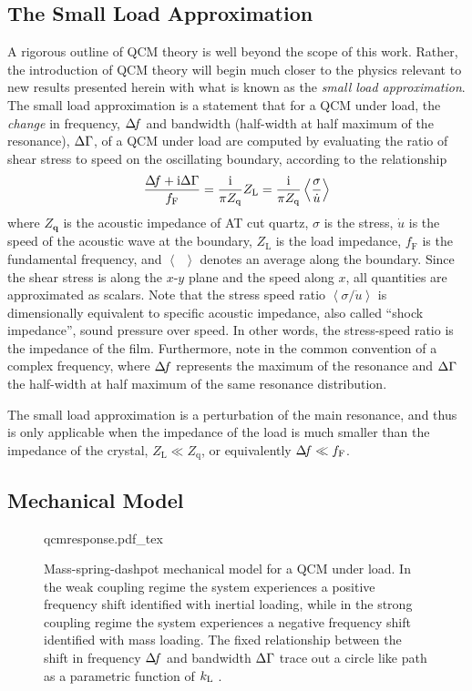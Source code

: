 \subsection{The Small Load Approximation}
A rigorous outline of QCM theory is well beyond the scope of this work.
Rather, the introduction of QCM theory will begin much closer to the
physics relevant to new results presented herein with what is known as the
\textit{small load approximation}.  The small load approximation is a
statement that for a QCM under load, the \textit{change} in frequency,
$\Delta\!f$ and bandwidth (half-width at half maximum of the resonance), $\Delta\Gamma$,
of a QCM under load are computed by evaluating the ratio of shear stress to
speed on the oscillating boundary, according to the
relationship~\cite{eggers1987method}~\cite{johannsmann1992viscoelastic}
\begin{equation}
 \frac{\Delta\!f+{\mathrm{i}}\Delta\Gamma}{f_{\mathrm{F}}}=\frac{{\mathrm{i}}}{\pi Z_{\mathrm{q}}}Z_\mathrm{L} =\frac{{\mathrm{i}}}{\pi Z_{\mathrm{q}}}\left<\frac{\sigma}{\dot{u}}\right>
\label{eqn:comsolextract}
\end{equation}
where $Z_\mathbf{q}$ is the acoustic impedance of AT cut quartz, $\sigma$
is the stress, $\dot{u}$ is the speed of the acoustic wave at the
boundary, $Z_\mathrm{L}$ is the load impedance, $f_{\mathrm{F}}$ is the
fundamental frequency, and $\left<\enspace\right>$ denotes an average
along the boundary.  Since the shear stress is along the $x$-$y$ plane and
the speed along $x$, all quantities are approximated as scalars.
Note that the stress speed ratio
$\left<\sigma/\dot{u}\right>$ is dimensionally equivalent to specific
acoustic impedance, also called ``shock impedance'', sound pressure over
speed.  In other words, the stress-speed ratio is the impedance of the
film.  Furthermore, note in  the common
convention of a complex frequency, where $\Delta\!f$ represents the maximum of
the resonance and $\Delta\Gamma$ the half-width at half maximum of the same
resonance distribution.

The small load approximation is a perturbation of the main resonance, and
thus is only applicable when the impedance of the load is much smaller than
the impedance of the crystal, $Z_\mathrm{L} \ll Z_\mathrm{q}$, or
equivalently $\Delta\!f \ll f_\mathrm{F}$.

\subsection{Mechanical Model}
\begin{figure}
\centering
{qcmresponse.pdf_tex}
\caption{ Mass-spring-dashpot mechanical model for a QCM under load. In the
weak coupling regime the system experiences a positive frequency shift
identified with inertial loading, while in the strong coupling regime the
system experiences a negative frequency shift identified with mass loading.
The fixed relationship between the shift in frequency $\Delta\!f$ and bandwidth
$\Delta\Gamma$ trace out a circle like path as a parametric function of $k_\mathrm{L}$ .  }
\label{fig:mechanicalmodel}
\end{figure}

